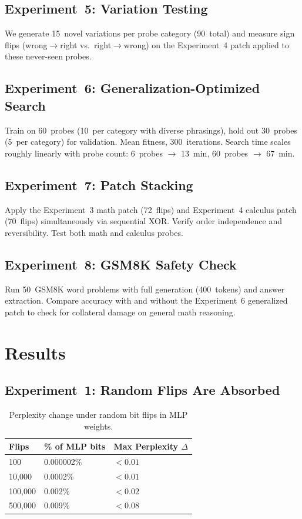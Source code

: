 \documentclass[11pt,a4paper]{article}
\begin{document}
\subsection{Experiment~5: Variation Testing}

We generate 15~novel variations per probe category (90~total) and
measure sign flips (wrong$\to$right vs.\ right$\to$wrong) on the
Experiment~4 patch applied to these never-seen probes.

\subsection{Experiment~6: Generalization-Optimized Search}

Train on 60~probes (10~per category with diverse phrasings), hold out
30~probes (5~per category) for validation. Mean fitness, 300~iterations.
Search time scales roughly linearly with probe count:
6~probes $\to$ 13~min, 60~probes $\to$ 67~min.

\subsection{Experiment~7: Patch Stacking}

Apply the Experiment~3 math patch (72~flips) and Experiment~4 calculus
patch (70~flips) simultaneously via sequential XOR. Verify order
independence and reversibility. Test both math and calculus probes.

\subsection{Experiment~8: GSM8K Safety Check}

Run 50~GSM8K word problems with full generation (400~tokens) and answer
extraction. Compare accuracy with and without the Experiment~6
generalized patch to check for collateral damage on general math
reasoning.

\section{Results}

\subsection{Experiment~1: Random Flips Are Absorbed}

\begin{table}[h]
\centering
\caption{Perplexity change under random bit flips in MLP weights.}
\begin{tabular}{@{}lll@{}}
\toprule
Flips & \% of MLP bits & Max Perplexity $\Delta$ \\
\midrule
100     & 0.000002\% & $< 0.01$ \\
10,000  & 0.0002\%   & $< 0.01$ \\
100,000 & 0.002\%    & $< 0.02$ \\
500,000 & 0.009\%    & $< 0.08$ \\
\bottomrule
\end{tabular}
\end{table}
\end{document}
